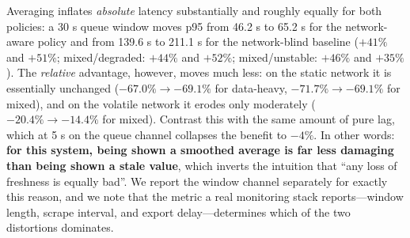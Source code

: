 Averaging inflates \emph{absolute} latency substantially and roughly equally for both policies:
a 30 s queue window moves p95 from 46.2 s to 65.2 s for the
network-aware policy and from 139.6 s to 211.1 s for the network-blind
baseline ($+41\%$ and $+51\%$; mixed/degraded: $+44\%$ and $+52\%$; mixed/unstable: $+46\%$ and
$+35\%$). The \emph{relative} advantage, however, moves much less: on the static network it is
essentially unchanged ($-67.0\%\rightarrow-69.1\%$ for data-heavy, $-71.7\%\rightarrow-69.1\%$
for mixed), and on the volatile network it erodes only moderately
($-20.4\%\rightarrow-14.4\%$ for mixed). Contrast this with the same amount of pure lag, which
at 5 s on the queue channel collapses the benefit to $-4\%$. In other words:
\textbf{for this system, being shown a smoothed average is far less damaging than being shown a
stale value}, which inverts the intuition that ``any loss of freshness is equally bad''. We
report the window channel separately for exactly this reason, and we note that the metric a real
monitoring stack reports---window length, scrape interval, and export delay---determines which of
the two distortions dominates.
